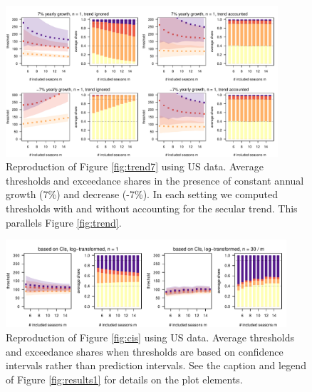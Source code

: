 \documentclass[12pt]{article}
\begin{document}
\begin{figure}
\begin{center}
\includegraphics[width = 0.9\textwidth]{figure/plot_trend7_us_small.pdf}
\end{center}
\caption{Reproduction of Figure \ref{fig:trend7} using US data. Average thresholds and exceedance shares in the presence of constant annual growth (7\%) and decrease (-7\%). In each setting we computed thresholds with and without accounting for the secular trend. This parallels Figure \ref{fig:trend}.}
\label{fig:trend7_us}
\end{figure}


\newpage

\begin{figure}
\includegraphics[width=0.93\textwidth]{figure/plot_ci_us.pdf}
\caption{Reproduction of Figure \ref{fig:cis} using US data. Average thresholds and exceedance shares when thresholds are based on confidence intervals rather than prediction intervals. See the caption and legend of Figure \ref{fig:results1} for details on the plot elements.}
\label{fig:cis_us}
\end{figure}

\newpage
\end{document}
